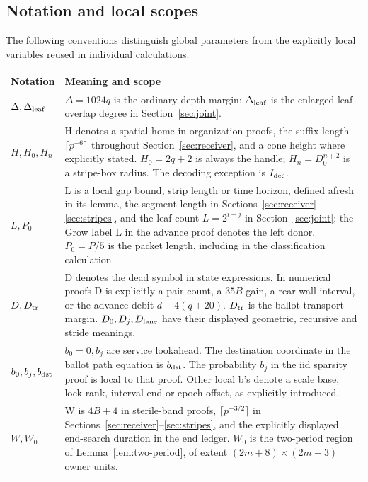 \subsection{Notation and local scopes}\label{sec:notation}
The following conventions distinguish global parameters from the explicitly local variables reused in individual calculations.
\begin{longtable}{@{}>{\raggedright\arraybackslash}p{.28\linewidth}>{\raggedright\arraybackslash}p{.64\linewidth}@{}}
\toprule
Notation & Meaning and scope \\
\midrule
\endhead
\(\Delta,\Delta_{\rm leaf}\) & \(\Delta=1024q\) is the ordinary depth margin; \(\Delta_{\rm leaf}\) is the enlarged-leaf overlap degree in Section~\ref{sec:joint}. \\
\(H,H_0,H_n\) & H denotes a spatial home in organization proofs, the suffix length \(\lceil p^{-6}\rceil\) throughout Section~\ref{sec:receiver}, and a cone height where explicitly stated. \(H_0=2q+2\) is always the handle; \(H_n=D_0^{n+2}\) is a stripe-box radius. The decoding exception is \(I_{\rm dec}\). \\
\(L,P_0\) & L is a local gap bound, strip length or time horizon, defined afresh in its lemma, the segment length in Sections~\ref{sec:receiver}--\ref{sec:stripes}, and the leaf count \(L=2^{i-j}\) in Section~\ref{sec:joint}; the Grow label L in the advance proof denotes the left donor. \(P_0=P/5\) is the packet length, including in the classification calculation. \\
\(D,D_{\rm tr}\) & D denotes the dead symbol in state expressions. In numerical proofs D is explicitly a pair count, a \(35B\) gain, a rear-wall interval, or the advance debit \(d+4(q+20)\). \(D_{\rm tr}\) is the ballot transport margin. \(D_0,D_j,D_{\rm lane}\) have their displayed geometric, recursive and stride meanings. \\
\(b_0,b_j,b_{\rm dst}\) & \(b_0=0,b_j\) are service lookahead. The destination coordinate in the ballot path equation is \(b_{\rm dst}\). The probability \(b_j\) in the iid sparsity proof is local to that proof. Other local b's denote a scale base, lock rank, interval end or epoch offset, as explicitly introduced. \\
\(W,W_0\) & W is \(4B+4\) in sterile-band proofs, \(\lceil p^{-3/2}\rceil\) in Sections~\ref{sec:receiver}--\ref{sec:stripes}, and the explicitly displayed end-search duration in the end ledger. \(W_0\) is the two-period region of Lemma~\ref{lem:two-period}, of extent \((2m+8)\times(2m+3)\) owner units. \\

\end{longtable}
